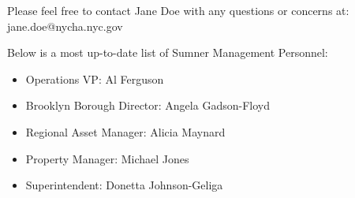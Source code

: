 {Please feel free to contact Jane Doe with any questions or concerns at: jane.doe@nycha.nyc.gov

Below is a most up-to-date list of Sumner Management Personnel:
\begin{itemize}
\item Operations VP: Al Ferguson
\item Brooklyn Borough Director: Angela Gadson-Floyd
\item Regional Asset Manager: Alicia Maynard
\item Property Manager: Michael Jones
\item Superintendent: Donetta Johnson-Geliga
\end{itemize}
}

